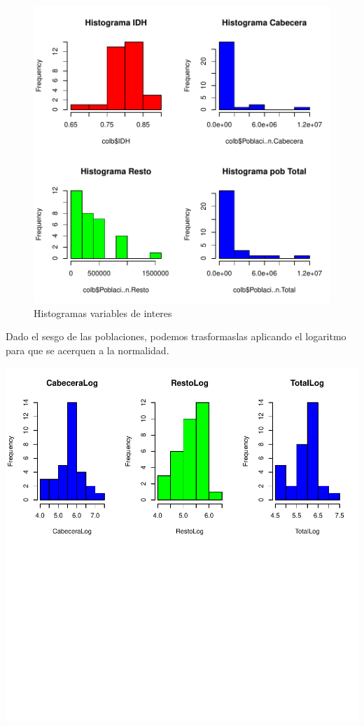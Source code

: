 \documentclass{article}
\begin{document}
\begin{figure}[h]
\centering

\includegraphics{proyectoFinal2-histogramas}

\caption{Histogramas variables de interes}
\label{histog}
\end{figure}

Dado el sesgo de las poblaciones, podemos trasformaslas aplicando el logaritmo para que se acerquen a la normalidad. 

\includegraphics{proyectoFinal2-HistogramasAjustados}
\end{document}
